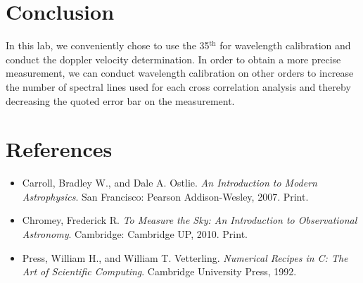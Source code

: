 \documentclass[authoryear, 12pt,5p, times]{elsarticle}
\begin{document}
\section{Conclusion}
In this lab, we conveniently chose to use the 35$^\text{th}$ for wavelength calibration and conduct the doppler velocity determination. In order to obtain a more precise measurement, we can conduct wavelength calibration on other orders to increase the number of spectral lines used for each cross correlation analysis and thereby decreasing the quoted error bar on the measurement.
 \section*{References}
 \begin{footnotesize}
 \begin{itemize}
 \item Carroll, Bradley W., and Dale A. Ostlie. \textit{An Introduction to Modern Astrophysics}. San Francisco: Pearson Addison-Wesley, 2007. Print.
\item Chromey, Frederick R. \textit{To Measure the Sky: An Introduction to Observational Astronomy}. Cambridge: Cambridge UP, 2010. Print.
\item Press, William H., and William T. Vetterling. \textit{Numerical Recipes in C: The Art of Scientific Computing}. Cambridge University Press, 1992.  
\end{itemize}
% 
%
  \end{footnotesize}
\end{document}
